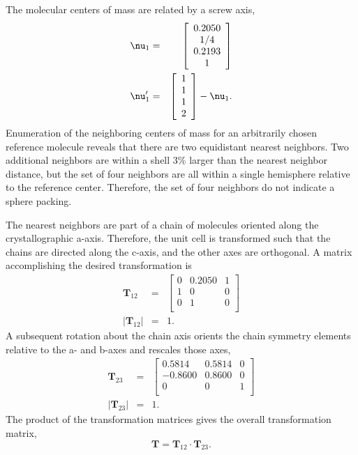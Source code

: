 \documentclass{iucr}              %
\begin{document}
The molecular centers of mass are related by a screw axis,
\begin{eqnarray}
   \mbox{\boldmath$\nu$}_{1}&=&\left[
     \begin{array}{c}
        0.2050\\
        1/4\\
        0.2193\\
	1\\
     \end{array}
  \right]\\
   \mbox{\boldmath$\nu$}_{1}^{\prime}&=&\left[
     \begin{array}{c}
        1\\
        1\\
        1\\
	2\\
     \end{array}
  \right]-\mbox{\boldmath$\nu$}_{1}.
\end{eqnarray}
Enumeration of the neighboring centers of mass for an arbitrarily chosen reference molecule reveals that there are two equidistant nearest neighbors.  Two additional neighbors are within a shell 3\% larger than the nearest neighbor distance, but the set of four neighbors are all within a single hemisphere relative to the reference center.  Therefore, the set of four neighbors do not indicate a sphere packing.

The nearest neighbors are part of a chain of molecules oriented along the crystallographic a-axis.  Therefore, the unit cell is transformed such that the chains are directed along the c-axis, and the other axes are orthogonal.  A matrix accomplishing the desired transformation is
\begin{eqnarray}
   \mathbf{T}_{12}&=&\left[
     \begin{array}{ccc}
        0& 0.2050& 1\\
        1& 0& 0\\
        0& 1& 0\\
     \end{array}
  \right]\\
   \vert\mathbf{T}_{12}\vert&=&1.
\end{eqnarray}
A subsequent rotation about the chain axis orients the chain symmetry elements relative to the a- and b-axes and rescales those axes,
\begin{eqnarray}
   \mathbf{T}_{23}&=&\left[
     \begin{array}{ccc}
        0.5814& 0.5814& 0\\
        -0.8600& 0.8600& 0\\
        0& 0& 1\\
     \end{array}
  \right]\\
   \vert\mathbf{T}_{23}\vert&=&1.
\end{eqnarray}
The product of the transformation matrices gives the overall transformation matrix,
\begin{equation}
\mathbf{T}=\mathbf{T}_{12}\cdot\mathbf{T}_{23}.
\end{equation}
\end{document}
